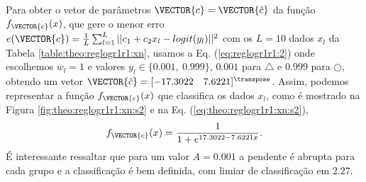 \begin{SolutionT}\label{sol:theo:reglogr1r1:s2}
Para obter o vetor de parâmetros $\VECTOR{c}=\VECTOR{\hat{c}}$ da função $f_{\VECTOR{c}}(x)$, 
que gere o menor erro $e(\VECTOR{c}) =  \frac{1}{L}\sum_{l=1}^{L} ||c_1 +c_2 x_l-logit(y_l)||^2$
com os $L=10$ dados $x_l$ da Tabela \ref{table:theo:reglogr1r1:xn},
usamos a Eq. (\ref{eq:reglogr1r1:2}) onde escolhemos $w_l=1$ e valores $y_l \in \{0.001,~ 0.999\}$,
$0.001$ para $\bigtriangleup$ e $0.999$ para $\bigcirc$,
obtendo um vetor $\VECTOR{\hat{c}}=[-17.3022\quad 7.6221]^{\transpose}$. 
Assim, podemos representar a função $f_{\VECTOR{c}}(x)$ que classifica os dados $x_l$, 
como é mostrado na Figura \ref{fig:theo:reglogr1r1:xn:s2}  e na Eq. (\ref{eq:theo:reglogr1r1:xn:s2}),
\begin{equation}\label{eq:theo:reglogr1r1:xn:s2}
f_{\VECTOR{c}}(x)= \frac{1}{1+e^{ 17.3022-7.6221 x}}.
\end{equation}
É interessante ressaltar que para um valor $A=0.001$ a pendente é abrupta para cada grupo e a classificação é bem definida,
com limiar de classificação em $2.27$.
\end{SolutionT}
